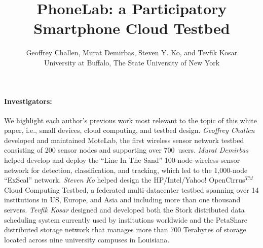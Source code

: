 \documentclass[12pt]{article}
\title{
{\Large PhoneLab: a Participatory Smartphone Cloud Testbed}
}
\author{
{\normalsize
Geoffrey Challen, Murat Demirbas, Steven Y. Ko, and Tevfik Kosar}\\
{\normalsize University at Buffalo, The State University of New York}
}
\date{}
\newcommand{\ie}{i.e.}
\begin{document}
\maketitle

\paragraph{Investigators:}
We highlight each author's previous work most relevant to the topic of this
white paper, \ie, small devices, cloud computing, and testbed design.
\emph{Geoffrey Challen} developed and
maintained MoteLab, the first wireless
sensor network testbed consisting of 200 sensor nodes and supporting over
700~users. \emph{Murat Demirbas} helped develop and deploy the ``Line In
The Sand'' 100-node wireless sensor network for
detection, classification, and tracking, which led to the 1,000-node
``ExScal'' network. \emph{Steven Ko} helped design the
HP/Intel/Yahoo! OpenCirrus$^{TM}$ Cloud
Computing Testbed, a federated multi-datacenter testbed spanning over
14 institutions in US, Europe, and Asia and including more than one
thousand servers. \emph{Tevfik Kosar} designed and developed both the
Stork distributed data scheduling system currently used by institutions
worldwide and the PetaShare distributed storage network that manages more
than 700 Terabytes of storage located across nine university campuses in
Louisiana.
\end{document}
